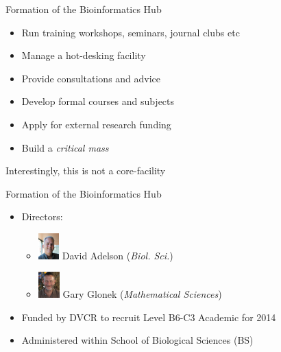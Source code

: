 \documentclass[11pt]{beamer}
\begin{document}
\begin{frame}{Formation of the Bioinformatics Hub}

	\begin{itemize}
		\item Run training workshops, seminars, journal clubs etc
		\item Manage a hot-desking facility
		\item Provide consultations and advice
		\item Develop formal courses and subjects
		\item Apply for external research funding
		\item Build a \textit{critical mass}
	\end{itemize}
	
	Interestingly, this is not a core-facility\\[5mm]

\end{frame}

\begin{frame}{Formation of the Bioinformatics Hub}

	\begin{itemize}
		\item Directors: 
		\begin{itemize}
			\item \includegraphics[height=1cm]{figures/dave.jpg} David Adelson (\textit{Biol. Sci.})
			\item \includegraphics[height=1cm]{figures/gary.jpg} Gary Glonek (\textit{Mathematical Sciences})
		\end{itemize}			
		\item Funded by DVCR to recruit Level B6-C3 Academic for 2014 
		\item Administered within School of Biological Sciences (BS)\\[1cm]

	\end{itemize}	
	
\end{frame}
\end{document}
